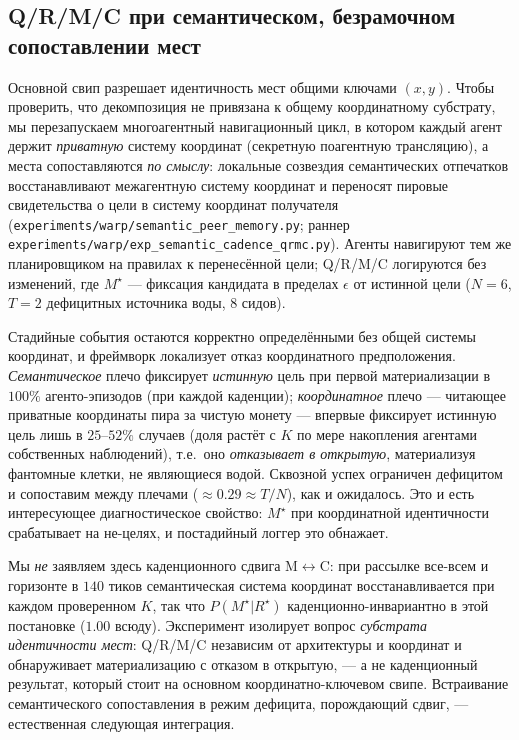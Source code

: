 \documentclass{article}
\newcommand{\method}[1]{\texttt{#1}}
\begin{document}
\subsection{Q/R/M/C при семантическом, безрамочном сопоставлении мест}
\label{app:semantic-matching}

Основной свип разрешает идентичность мест общими ключами $(x,y)$. Чтобы проверить, что
декомпозиция не привязана к общему координатному субстрату, мы перезапускаем
многоагентный навигационный цикл, в котором каждый агент держит \emph{приватную}
систему координат (секретную поагентную трансляцию), а места сопоставляются
\emph{по смыслу}: локальные созвездия семантических отпечатков восстанавливают
межагентную систему координат и переносят пировые свидетельства о цели в систему координат
получателя (\method{experiments/warp/semantic\_peer\_memory.py}; раннер
\method{experiments/warp/exp\_semantic\_cadence\_qrmc.py}). Агенты навигируют
тем же планировщиком на правилах к перенесённой цели; Q/R/M/C логируются
без изменений, где $M^\star$ --- фиксация кандидата в пределах $\epsilon$ от истинной
цели ($N{=}6$, $T{=}2$ дефицитных источника воды, $8$ сидов).

Стадийные события остаются корректно определёнными без общей системы координат, и фреймворк
локализует отказ координатного предположения. \emph{Семантическое} плечо фиксирует
\emph{истинную} цель при первой материализации в $100\%$ агенто-эпизодов (при
каждой каденции); \emph{координатное} плечо --- читающее приватные
координаты пира за чистую монету --- впервые фиксирует истинную цель лишь в $25$--$52\%$
случаев (доля растёт с $K$ по мере накопления агентами собственных наблюдений), т.е.\ оно
\emph{отказывает в открытую}, материализуя фантомные клетки, не являющиеся водой. Сквозной
успех ограничен дефицитом и сопоставим между плечами ($\approx0.29\!\approx\!T/N$),
как и ожидалось. Это и есть интересующее диагностическое свойство: $M^\star$ при
координатной идентичности срабатывает на не-целях, и постадийный логгер это обнажает.

Мы \emph{не} заявляем здесь каденционного сдвига M$\leftrightarrow$C: при
рассылке все-всем и горизонте в $140$ тиков семантическая система координат восстанавливается при
каждом проверенном $K$, так что $P(M^\star|R^\star)$ каденционно-инвариантно в этой постановке
($1.00$ всюду). Эксперимент изолирует вопрос \emph{субстрата идентичности мест}:
Q/R/M/C независим от архитектуры и координат и обнаруживает
материализацию с отказом в открытую, --- а не каденционный результат, который стоит на
основном координатно-ключевом свипе. Встраивание семантического сопоставления в режим
дефицита, порождающий сдвиг, --- естественная следующая интеграция.
\end{document}
